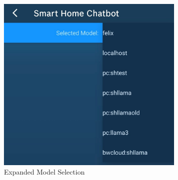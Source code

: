 \begin{figure}[b]
    \centering
      \begin{subfigure}[t]{.48\textwidth}
        \vspace*{0pt}
        \includegraphics[width=\textwidth]{graphics/model-select.jpg}
        \caption{Expanded Model Selection}
        \label{fig:model-select}
      \end{subfigure} \hfill
      \begin{subfigure}[t]{.48\textwidth}
        \vspace*{0pt}

\end{subfigure}
\end{figure}
